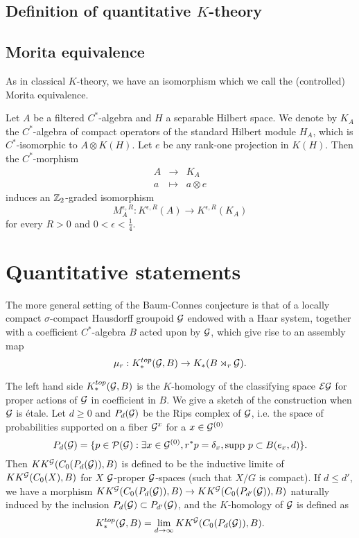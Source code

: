 \subsection{Definition of quantitative $K$-theory} 

\subsection{Morita equivalence}

As in classical $K$-theory, we have an isomorphism which we call the (controlled) Morita equivalence.
\begin{prop}
Let $A$ be a filtered $C^*$-algebra and $H$ a separable Hilbert space. We denote by $K_A$ the $C^*$-algebra of compact operators of the standard Hilbert module $H_A$, which is $C^*$-isomorphic to $A\otimes K(H)$. Let $e$ be any rank-one projection in $K(H)$. Then the $C^*$-morphism 
\[\begin{array}{lll} A & \rightarrow & K_A \\ a &\mapsto & a\otimes e\end{array}\]
induces an $\mathbb Z_2$-graded isomorphism
\[M_A^{\epsilon, R} : K^{\epsilon , R}(A)\rightarrow K^{\epsilon , R}(K_A)\]
for every $R>0$ and $0< \epsilon <\frac{1}{4}$.
\end{prop}

\section{Quantitative statements}

The more general setting of the Baum-Connes conjecture \cite{TuBC} is that of a locally compact $\sigma$-compact Hausdorff groupoid $\mathcal G$ endowed with a Haar system, together with a coefficient $C^*$-algebra $B$ acted upon by $\mathcal G$, which give rise to an assembly map
\[\mu_r : K^{top}_*(\mathcal G,B)\rightarrow K_*(B\rtimes_r \mathcal G).\]

The left hand side $K^{top}_*(\mathcal G,B)$ is the $K$-homology of the classifying space $\mathcal E \mathcal G$ for proper actions of $\mathcal G$ in coefficient in $B$. We give a sketch of the construction when $\mathcal G$ is étale. Let $d\geq 0$ and $P_d(\mathcal G)$ be the Rips complex of $\mathcal G$, i.e. the space of probabilities supported on a fiber $\mathcal G^x$ for a $x\in \mathcal G^{(0)}$
\[P_d(\mathcal G) = \{p\in \mathcal P(\mathcal G) : \exists x\in \mathcal G^{(0)}, r^*p=\delta_x, \text{supp }p \subset B(e_x,d)\}.\]
Then $KK^\mathcal G( C_0(P_d(\mathcal G)),B)$ is defined to be the inductive limite of $KK^\mathcal G( C_0(X),B)$ for $X$ $\mathcal G$-proper $\mathcal G$-spaces (such that $X/G$ is compact). If $d\leq d'$, we have a morphism $KK^\mathcal G( C_0(P_d(\mathcal G)),B)\rightarrow KK^\mathcal G( C_0(P_{d'}(\mathcal G)),B)$ naturally induced by the inclusion $P_d(\mathcal G)\subset P_{d'}(\mathcal G)$, and the $K$-homology of $\mathcal G$ is defined as
\[K^{top}_*(\mathcal G,B)=\lim_{d\rightarrow \infty} KK^\mathcal G( C_0(P_d(\mathcal G)),B).\]

